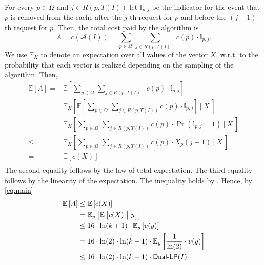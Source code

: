 \documentclass[11pt]{article}
\newcommand{\cA}{{\mathcal{A}}}
\newcommand{\E}{{\mathbb{E}}}
\newcommand{\om}{{\Omega}}
\begin{document}
{ For every $p \in \om$ and $j \in R(p,T(I))$ let $ \mathbb{I}_{p,j}$ be the indicator for the event that $p$ is removed from the cache after the $j$-th request for $p$ and before the $(j+1)$-th request for $p$. Then, the total cost paid by the algorithm is $$A = c \left( \cA (I) \right) = \sum_{p \in \om~} \sum_{j \in R(p,T(I))} c(p) \cdot \mathbb{I}_{p,j}.$$
We use $\E_{X}$ to denote an expectation over all values of the vector $X$, w.r.t. to the probability that each vector is realized depending on the sampling of the algorithm. Then,
\begin{equation}
	\label{eq:main}
	\begin{aligned}
	\E \left[ A \right] ={} & \E \left[ \sum_{p \in \om~} \sum_{j \in R(p,T(I))} c(p) \cdot \mathbb{I}_{p,j} \right]\\
	={} & \E_{X} \left[ \E \left[ \sum_{p \in \om~} \sum_{j \in R(p,T(I))} c(p) \cdot \mathbb{I}_{p,j} \right] ~\bigg| ~X~\right]\\
	={} &  \E_{X} \left[ \sum_{p \in \om~} \sum_{j \in R(p,T(I))} c(p) \cdot \Pr \left( \mathbb{I}_{p,j} = 1 \right) ~\bigg| ~X~\right] \\
	\leq{} &   \E_{X} \left[  \sum_{p \in \om~} \sum_{j \in R(p,T(I))} c(p) \cdot X_p(j-1) ~\bigg| ~X~\right] \\
		={} &   \E \left[  c(X) \right] \\
	\end{aligned}
\end{equation} The second equality follows by the law of total expectation. The third equality follows by the linearity of the expectation. The inequality holds by . Hence, by \eqref{eq:main}
\begin{equation}
	\label{eq:final}
	\begin{aligned}
		\E \left[ A \right] 	\leq{} &   \E \left[  c(X) \right] \\
		={} &  \E_y \left[ \E \left[  c(X)~\big|~y \right]\right] \\
			\leq{} &  		16 \cdot \ln (k+1) \cdot \E_{y} \left[v(y)\right] \\
		={} &  		16 \cdot \ln (2) \cdot \ln (k+1) \cdot \E_{y} \left[\frac{1}{\ln (2)} \cdot v(y)\right] \\
		\leq{} & 16 \cdot \ln (2) \cdot \ln (k+1) \cdot \textnormal{\textsf{Dual-LP}}(I) \\

\end{aligned}
\end{equation}}
\end{document}
